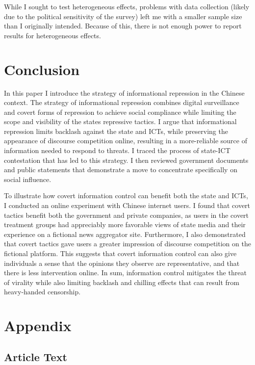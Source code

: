 \documentclass[11pt]{article}
\begin{document}
While I sought to test heterogeneous effects, problems with data collection (likely due to the political sensitivity of the survey) left me with a smaller sample size than I originally intended. Because of this, there is not enough power to report results for heterogeneous effects.

\section{Conclusion}\label{conclusion}

In this paper I introduce the strategy of informational repression in the Chinese context. The strategy of informational repression combines digital surveillance and covert forms of repression to achieve social compliance while limiting the scope and visibility of the states repressive tactics. I argue that informational repression limits backlash against the state and ICTs, while preserving the appearance of discourse competition online, resulting in a more-reliable source of information needed to respond to threats. I traced the process of state-ICT contestation that has led to this strategy. I then reviewed government documents and public statements that demonstrate a move to concentrate specifically on social influence.

To illustrate how covert information control can benefit both the state and ICTs, I conducted an online experiment with Chinese internet users. I found that covert tactics benefit both the government and private companies, as users in the covert treatment groups had appreciably more favorable views of state media and their experience on a fictional news aggregator site. Furthermore, I also demonstrated that covert tactics gave users a greater impression of discourse competition on the fictional platform. This suggests that covert information control can also give individuals a sense that the opinions they observe are representative, and that there is less intervention online. In sum, information control mitigates the threat of virality while also limiting backlash and chilling effects that can result from heavy-handed censorship.


\newpage

\section{Appendix}\label{appendix}

\subsection{Article Text}\label{text}
\end{document}
